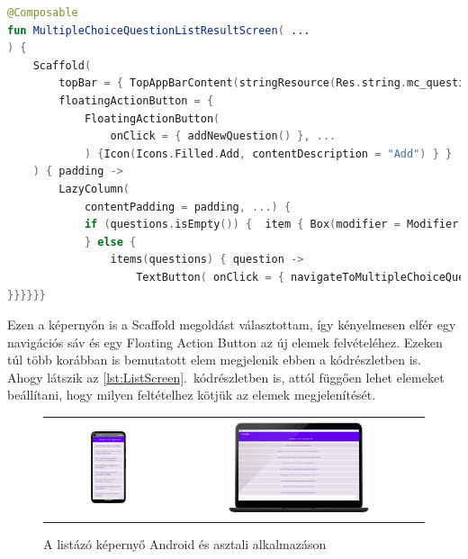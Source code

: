 \begin{lstlisting}[caption={Listázó képernyő.}, label={lst:ListScreen}, language=Kotlin, float]
@Composable
fun MultipleChoiceQuestionListResultScreen( ...
) {
    Scaffold(
        topBar = { TopAppBarContent(stringResource(Res.string.mc_question_list), navigateBack) },
        floatingActionButton = {
            FloatingActionButton(
                onClick = { addNewQuestion() }, ...
            ) {Icon(Icons.Filled.Add, contentDescription = "Add") } }
    ) { padding ->
        LazyColumn(
            contentPadding = padding, ...) {
            if (questions.isEmpty()) {  item { Box(modifier = Modifier ...) { Text(...) } }
            } else {
                items(questions) { question ->
                    TextButton( onClick = { navigateToMultipleChoiceQuestionDetails(question.uuid) }, ... ) { Text(text = question.name, ...) 
}}}}}}
\end{lstlisting}

Ezen a képernyőn is a Scaffold megoldást választottam, így kényelmesen elfér egy navigációs sáv és egy Floating Action Button az új elemek felvételéhez.
Ezeken túl több korábban is bemutatott elem megjelenik ebben a kódrészletben is.
Ahogy látszik az \ref{lst:ListScreen}.~kódrészletben is, attól függően lehet elemeket beállítani, hogy milyen feltételhez kötjük az elemek megjelenítését.

\begin{figure}[!ht]
    \centering
    \begin{tabular}{cc}
        \includegraphics[width=0.3\textwidth, keepaspectratio]{figures/List_Android.png} & 
        \includegraphics[width=0.6\textwidth, keepaspectratio]{figures/ListView_Desktop_framed.png}
    \end{tabular}
    \caption{A listázó képernyő Android és asztali alkalmazáson}
    \label{fig:ListScreen}
\end{figure}


